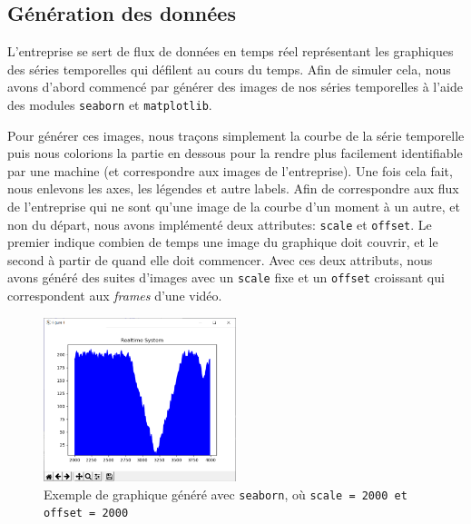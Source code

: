 \documentclass[french]{article}
\theoremstyle{mytheoremstyle}
\theoremstyle{mytheoremstyle}
\theoremstyle{myproblemstyle}
\begin{document}
        \subsection{Génération des données}
        L'entreprise se sert de flux de données en temps réel représentant les graphiques des séries temporelles qui défilent au cours du temps. Afin de simuler cela, nous avons d'abord commencé par générer des images de nos séries temporelles à l'aide des modules \texttt{seaborn} et \texttt{matplotlib}.
        
        Pour générer ces images, nous traçons simplement la courbe de la série temporelle puis nous colorions la partie en dessous pour la rendre plus facilement identifiable par une machine (et correspondre aux images de l'entreprise). Une fois cela fait, nous enlevons les axes, les légendes et autre labels. Afin de correspondre aux flux de l'entreprise qui ne sont  qu'une image de la courbe d'un moment à un autre, et non du départ, nous avons implémenté deux attributes: \texttt{scale} et \texttt{offset}. Le premier indique combien de temps une image du graphique doit couvrir, et le second à partir de quand elle doit commencer. Avec ces deux attributs, nous avons généré des suites d'images avec un \texttt{scale} fixe et un \texttt{offset} croissant qui correspondent aux \emph{frames} d'une vidéo.
        
        
        \begin{figure}[H]
            \centering
            \includegraphics[width=0.5\textwidth]{images/scaleoffset.png}
            \caption{Exemple de graphique généré avec \texttt{seaborn}, où \texttt{scale = 2000 et offset = 2000}}
            \label{}
        \end{figure}
        
\end{document}
